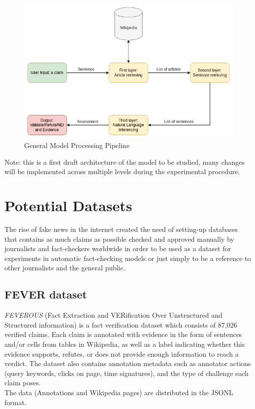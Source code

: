 \documentclass[10pt, english]{report}
\begin{document}
\begin{figure}[H]
	\centering
	\includegraphics[scale=0.6]{img/use_case.png}
	\caption{General Model Processing Pipeline}
\end{figure}

Note: this is a first draft architecture of the model to be studied, many changes will be implemented across multiple levels during the experimental procedure.

\chapter{Potential Datasets}
The rise of fake news in the internet created the need of setting-up databases that contains as much claims as possible checked and approved manually by journalists and fact-checkers worldwide in order to be used as a dataset for experiments in automatic fact-checking models or just simply to be a reference to other journalists and the general public.

\section{FEVER dataset \cite{Aly21Feverous}}
\textit{FEVEROUS} (Fact Extraction and VERification Over Unstructured and Structured information) is a fact verification dataset which consists of 87,026 verified claims. Each claim is annotated with evidence in the form of sentences and/or cells from tables in Wikipedia, as well as a label indicating whether this evidence supports, refutes, or does not provide enough information to reach a verdict. The dataset also contains annotation metadata such as annotator actions (query keywords, clicks on page, time signatures), and the type of challenge each claim poses.\\
The data (Annotations and Wikipedia pages) are distributed in the JSONL format.
\end{document}
